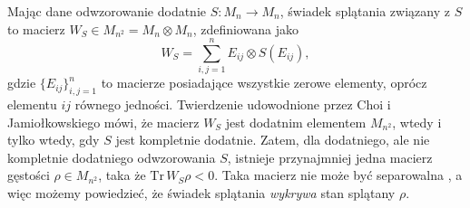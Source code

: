 {Mając dane odwzorowanie dodatnie $S: M_{n} \rightarrow M_{n}$,
świadek splątania związany z $S$ to macierz
$W_{S} \in M_{n^{2}} = M_{n} \! \otimes \! M_{n}$,
zdefiniowana jako
\begin{equation}
\label{def:entanglement-witness}
    W_{S} = \sum \limits_{i,j =1}^{n} E_{ij} \otimes S(E_{ij}),
\end{equation}
gdzie $\{ E_{ij}\}_{i,j=1}^{n}$ to macierze posiadające wszystkie
zerowe elementy, oprócz elementu $ij$ równego jedności.
Twierdzenie udowodnione przez Choi i Jamiołkowskiego
\cite{choi1975completely,jamiolkowski1974effective}
mówi, że macierz $W_{S}$ jest dodatnim elementem $M_{n^{2}}$,
wtedy i tylko wtedy, gdy $S$ jest kompletnie dodatnie.
Zatem, dla dodatniego, ale nie kompletnie dodatniego odwzorowania $S$,
istnieje przynajmniej jedna macierz gęstości $\rho \in M_{n^{2}}$,
taka że $\text{Tr}\, W_{S} \rho < 0$.
Taka macierz nie może być separowalna \cite{werner1989quantum},
a więc możemy powiedzieć, że świadek splątania \emph{wykrywa}
stan splątany $\rho$.

}
